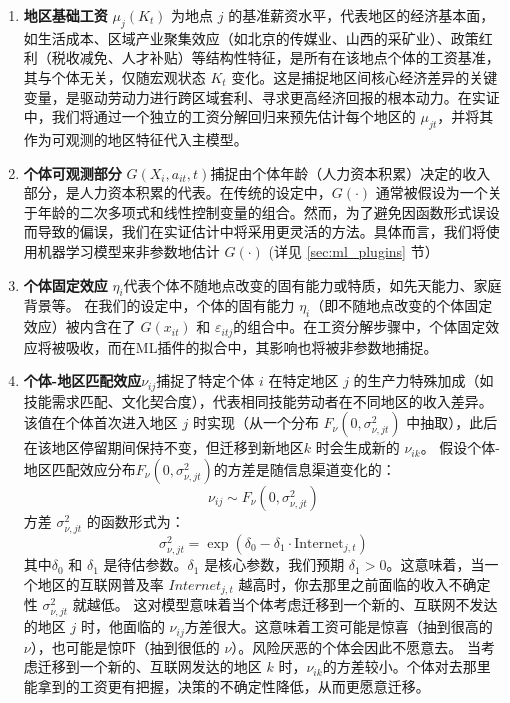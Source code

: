 \documentclass[
  a4paper,
  zihao=-4,
  fontset=mac,
  AutoFakeBold,
  AutoFakeSlant,
  oneside]{ctexbook}
\begin{document}
\begin{enumerate}
  \item \textbf{地区基础工资} $\mu_j(K_t)$ 为地点 $j$ 的基准薪资水平，代表地区的经济基本面，如生活成本、区域产业聚集效应（如北京的传媒业、山西的采矿业）、政策红利（税收减免、人才补贴）等结构性特征，是所有在该地点个体的工资基准，其与个体无关，仅随宏观状态 $K_t$ 变化。这是捕捉地区间核心经济差异的关键变量，是驱动劳动力进行跨区域套利、寻求更高经济回报的根本动力。在实证中，我们将通过一个独立的工资分解回归来预先估计每个地区的 $\mu_{jt}$，并将其作为可观测的地区特征代入主模型。

  \item \textbf{个体可观测部分} $G(X_i, a_{it}, t)$捕捉由个体年龄（人力资本积累）决定的收入部分，是人力资本积累的代表。在传统的设定中，$G(\cdot)$ 通常被假设为一个关于年龄的二次多项式和线性控制变量的组合。然而，为了避免因函数形式误设而导致的偏误，我们在实证估计中将采用更灵活的方法。具体而言，我们将使用机器学习模型来非参数地估计 $G(\cdot)$ (详见 \ref{sec:ml_plugins} 节）

  \item \textbf{个体固定效应} $\eta_i$代表个体不随地点改变的固有能力或特质，如先天能力、家庭背景等。
  在我们的设定中，个体的固有能力 $\eta_i$（即不随地点改变的个体固定效应）被内含在了 $G(x_{it})$ 和 $\varepsilon_{itj} $的组合中。在工资分解步骤中，个体固定效应将被吸收，而在ML插件的拟合中，其影响也将被非参数地捕捉。

  \item \textbf{个体-地区匹配效应}$\nu_{ij}$捕捉了特定个体 $i$ 在特定地区 $j$ 的生产力特殊加成（如技能需求匹配、文化契合度），代表相同技能劳动者在不同地区的收入差异。该值在个体首次进入地区 $j$ 时实现（从一个分布 $F_\nu(0, \sigma_{\nu,jt}^2)$ 中抽取），此后在该地区停留期间保持不变，但迁移到新地区$k$ 时会生成新的 $\nu_{ik}$。
  假设个体-地区匹配效应分布$F_\nu(0, \sigma_{\nu,jt}^2)$的方差是随信息渠道变化的：
  \begin{equation}
    \nu_{ij} \sim F_\nu(0, \sigma_{\nu,jt}^2)
  \end{equation}
  方差 $\sigma_{\nu,jt}^2$ 的函数形式为：
  \begin{equation}
    \sigma_{\nu,jt}^2 = \exp(\delta_0 - \delta_1 \cdot \text{Internet}_{j,t})
  \end{equation}
  其中$\delta_0$ 和 $\delta_1$ 是待估参数。$\delta_1$ 是核心参数，我们预期 $\delta_1 > 0$。这意味着，当一个地区的互联网普及率 $Internet_{j,t}$ 越高时，你去那里之前面临的收入不确定性 $\sigma_{\nu,jt}^2$ 就越低。
  这对模型意味着当个体考虑迁移到一个新的、互联网不发达的地区 $j$ 时，他面临的 $\nu_{ij}$方差很大。这意味着工资可能是惊喜（抽到很高的 $\nu$），也可能是惊吓（抽到很低的 $\nu$）。风险厌恶的个体会因此不愿意去。
  当考虑迁移到一个新的、互联网发达的地区 $k$ 时，$\nu_{ik}$的方差较小。个体对去那里能拿到的工资更有把握，决策的不确定性降低，从而更愿意迁移。


\end{enumerate}
\end{document}
